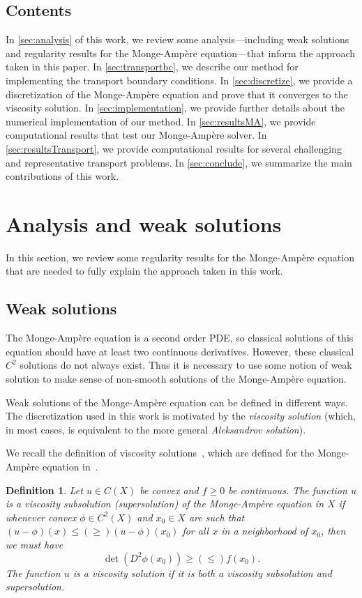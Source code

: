\documentclass{amsart}
\theoremstyle{lemma}
\newtheorem{definition}{Definition}
\theoremstyle{remark}
\begin{document}
\subsection{Contents}\label{sec:contents}
In \autoref{sec:analysis} of this work, we review some analysis---including weak solutions and regularity results for the {{Monge-Amp\`ere}\xspace} equation---that inform the approach taken in this paper.  In \autoref{sec:transportbc}, we describe our method for implementing the transport boundary conditions.  In \autoref{sec:discretize}, we provide a discretization of the {{Monge-Amp\`ere}\xspace} equation and prove that it converges to the viscosity solution.  In \autoref{sec:implementation}, we provide further details about the numerical implementation of our method.  In \autoref{sec:resultsMA}, we provide computational results that test our {{Monge-Amp\`ere}\xspace} solver.  In \autoref{sec:resultsTransport}, we provide computational results for several challenging and representative transport problems.  In \autoref{sec:conclude}, we summarize the main contributions of this work.

\section{Analysis and weak solutions}\label{sec:analysis}
In this section, we review some regularity results for the {{Monge-Amp\`ere}\xspace} equation that are needed to fully explain the approach taken in this work.

\subsection{Weak solutions}\label{sec:weak}
The {{Monge-Amp\`ere}\xspace} equation is a second order PDE, so classical solutions of this equation should have at least two continuous derivatives.  However, these classical $C^2$ solutions do not always exist.  Thus it is necessary to use some notion of weak solution to make sense of non-smooth solutions of the {{Monge-Amp\`ere}\xspace} equation.  

Weak solutions of the {{Monge-Amp\`ere}\xspace} equation can be defined in different ways.  The discretization used in this work is motivated by the \emph{viscosity solution} (which, in most cases, is equivalent to the more general \emph{Aleksandrov solution}).

We recall the definition of viscosity solutions~\cite{CIL}, which are defined for the {{Monge-Amp\`ere}\xspace} equation in~\cite{Gutierrez}. 
\begin{definition}
Let $u \in C(X)$ be convex and $f\geq0$ be continuous.  The function $u$ is a \emph{viscosity subsolution (supersolution)} of the {{Monge-Amp\`ere}\xspace} equation in $X$ if whenever convex $\phi\in C^2(X)$ and $x_0\in X$ are such that $(u-\phi)(x)\leq(\geq)(u-\phi)(x_0)$ for all $x$ in a neighborhood of $x_0$, then we must have
\[ \det(D^2\phi(x_0)) \geq(\leq)f(x_0). \]
The function $u$ is a \emph{viscosity solution} if it is both a viscosity subsolution and supersolution.
\end{definition}
\end{document}
